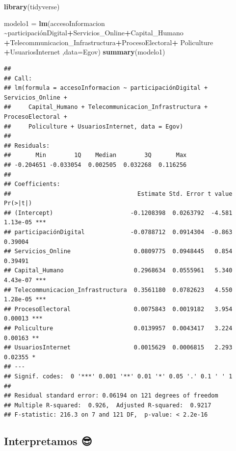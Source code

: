 \documentclass[
]{article}
\newenvironment{Shaded}{\begin{snugshade}}{\end{snugshade}}
\newcommand{\AttributeTok}[1]{\textcolor[rgb]{0.13,0.29,0.53}{#1}}
\newcommand{\FunctionTok}[1]{\textcolor[rgb]{0.13,0.29,0.53}{\textbf{#1}}}
\newcommand{\NormalTok}[1]{#1}
\newcommand{\OtherTok}[1]{\textcolor[rgb]{0.56,0.35,0.01}{#1}}
\newcommand{\SpecialCharTok}[1]{\textcolor[rgb]{0.81,0.36,0.00}{\textbf{#1}}}
\begin{document}
\begin{Shaded}
\begin{Highlighting}[]
\FunctionTok{library}\NormalTok{(tidyverse)}

\NormalTok{modelo1 }\OtherTok{=} \FunctionTok{lm}\NormalTok{(accesoInformacion }\SpecialCharTok{\textasciitilde{}}\NormalTok{participaciónDigital}\SpecialCharTok{+}\NormalTok{Servicios\_Online}\SpecialCharTok{+}\NormalTok{Capital\_Humano  }\SpecialCharTok{+}\NormalTok{Telecommunicacion\_Infrastructura}\SpecialCharTok{+}\NormalTok{ProcesoElectoral}\SpecialCharTok{+}\NormalTok{ Policulture }\SpecialCharTok{+}\NormalTok{UsuariosInternet ,}\AttributeTok{data=}\NormalTok{Egov)}
\FunctionTok{summary}\NormalTok{(modelo1)}
\end{Highlighting}
\end{Shaded}

\begin{verbatim}
## 
## Call:
## lm(formula = accesoInformacion ~ participaciónDigital + Servicios_Online + 
##     Capital_Humano + Telecommunicacion_Infrastructura + ProcesoElectoral + 
##     Policulture + UsuariosInternet, data = Egov)
## 
## Residuals:
##       Min        1Q    Median        3Q       Max 
## -0.204651 -0.033054  0.002505  0.032268  0.116256 
## 
## Coefficients:
##                                    Estimate Std. Error t value Pr(>|t|)    
## (Intercept)                      -0.1208398  0.0263792  -4.581 1.13e-05 ***
## participaciónDigital             -0.0788712  0.0914304  -0.863  0.39004    
## Servicios_Online                  0.0809775  0.0948445   0.854  0.39491    
## Capital_Humano                    0.2968634  0.0555961   5.340 4.43e-07 ***
## Telecommunicacion_Infrastructura  0.3561180  0.0782623   4.550 1.28e-05 ***
## ProcesoElectoral                  0.0075843  0.0019182   3.954  0.00013 ***
## Policulture                       0.0139957  0.0043417   3.224  0.00163 ** 
## UsuariosInternet                  0.0015629  0.0006815   2.293  0.02355 *  
## ---
## Signif. codes:  0 '***' 0.001 '**' 0.01 '*' 0.05 '.' 0.1 ' ' 1
## 
## Residual standard error: 0.06194 on 121 degrees of freedom
## Multiple R-squared:  0.926,  Adjusted R-squared:  0.9217 
## F-statistic: 216.3 on 7 and 121 DF,  p-value: < 2.2e-16
\end{verbatim}

\subsection{\texorpdfstring{\textbf{Interpretamos
😎}}{Interpretamos 😎}}\label{interpretamos}
\end{document}
